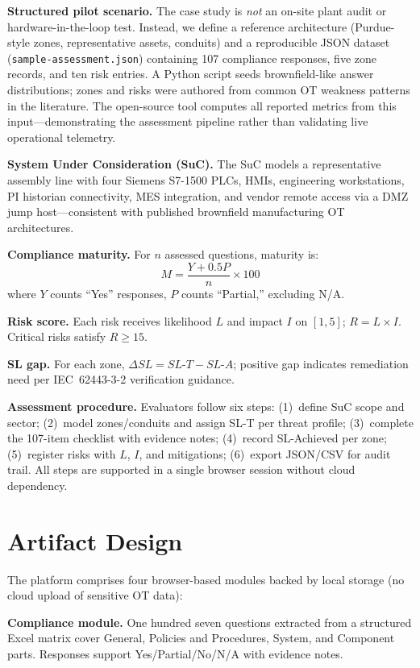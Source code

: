 \documentclass[10pt,conference]{IEEEtran}
\begin{document}
\textbf{Structured pilot scenario.} The case study is \emph{not} an on-site plant audit or hardware-in-the-loop test. Instead, we define a reference architecture (Purdue-style zones, representative assets, conduits) and a reproducible JSON dataset (\texttt{sample-assessment.json}) containing 107 compliance responses, five zone records, and ten risk entries. A Python script seeds brownfield-like answer distributions; zones and risks were authored from common OT weakness patterns in the literature. The open-source tool computes all reported metrics from this input---demonstrating the assessment pipeline rather than validating live operational telemetry.

\textbf{System Under Consideration (SuC).} The SuC models a representative assembly line with four Siemens S7-1500 PLCs, HMIs, engineering workstations, PI historian connectivity, MES integration, and vendor remote access via a DMZ jump host---consistent with published brownfield manufacturing OT architectures.

\textbf{Compliance maturity.} For $n$ assessed questions, maturity is:
\begin{equation}
M = \frac{Y + 0.5P}{n} \times 100
\end{equation}
where $Y$ counts ``Yes'' responses, $P$ counts ``Partial,'' excluding N/A.

\textbf{Risk score.} Each risk receives likelihood $L$ and impact $I$ on $[1,5]$; $R = L \times I$. Critical risks satisfy $R \geq 15$.

\textbf{SL gap.} For each zone, $\Delta SL = SL\text{-}T - SL\text{-}A$; positive gap indicates remediation need per IEC~62443-3-2 verification guidance.

\textbf{Assessment procedure.} Evaluators follow six steps: (1)~define SuC scope and sector; (2)~model zones/conduits and assign SL-T per threat profile; (3)~complete the 107-item checklist with evidence notes; (4)~record SL-Achieved per zone; (5)~register risks with $L$, $I$, and mitigations; (6)~export JSON/CSV for audit trail. All steps are supported in a single browser session without cloud dependency.

\section{Artifact Design}
The platform comprises four browser-based modules backed by local storage (no cloud upload of sensitive OT data):

\textbf{Compliance module.} One hundred seven questions extracted from a structured Excel matrix cover General, Policies and Procedures, System, and Component parts. Responses support Yes/Partial/No/N/A with evidence notes.
\end{document}

